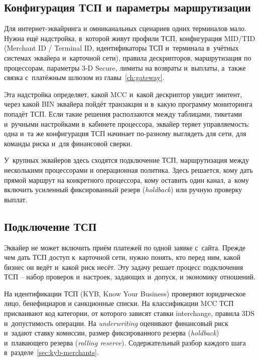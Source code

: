 \subsection*{Конфигурация ТСП и параметры маршрутизации}

Для интернет-эквайринга и омниканальных сценариев одних терминалов
мало. Нужна ещё надстройка, в~которой живут профили ТСП, конфигурация
MID/TID (Merchant ID / Terminal ID, идентификаторы ТСП и~терминала
в~учётных системах эквайера и~карточной сети), правила дескрипторов,
маршрутизация по процессорам,
параметры 3-D Secure, лимиты на возвраты и~выплаты, а~также связка
с~платёжным шлюзом из главы~\ref{ch:gateway}.

Эта надстройка определяет, какой MCC и~какой дескриптор увидит
эмитент, через какой BIN эквайера пойдёт транзакция и в~какую программу
мониторинга попадёт ТСП. Если такие решения расползаются между
таблицами, тикетами и~ручными настройками в~кабинете процессора,
эквайер теряет управляемость: одна и~та же конфигурация ТСП начинает
по-разному выглядеть для сети, для команды риска и~для финансовой
сверки.~\cite{visa-merchant-data-standards-manual}

У~крупных эквайеров здесь сходятся подключение ТСП,
маршрутизация между несколькими процессорами и операционная политика.
Здесь решается, кому дать прямой маршрут на конкретного процессора,
кому оставить один канал, а~кому включить усиленный фиксированный резерв (\textit{holdback}) или
ручную проверку выплат.

\subsection*{Подключение ТСП}

Эквайер не может включить приём платежей по одной заявке с~сайта.
Прежде чем дать ТСП доступ к~карточной сети, нужно понять, кто
перед ним, какой бизнес он ведёт и~какой риск несёт. Эту задачу
решает процесс подключения ТСП -- набор проверок и~настроек,
задающих и~допуск, и экономику отношений.

На идентификации ТСП (KYB, Know Your Business) проверяют юридическое лицо, бенефициаров и санкционные
списки. На классификации MCC ТСП присваивают код категории, от
которого зависят ставки interchange, правила 3DS и~допустимость
операции. На \textit{underwriting} оценивают финансовый риск и~задают
ставку комиссии, размер фиксированного резерва (\textit{holdback}) и~плавающего резерва (\textit{rolling reserve}). Содержательный разбор каждого шага в~разделе~\ref{sec:kyb-merchants}.

